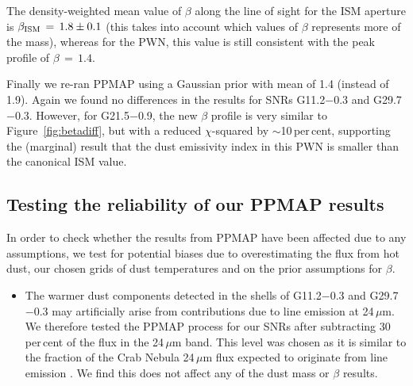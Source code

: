 \documentclass[fleqn,usenatbib]{mnras}
\begin{document}
{{The density-weighted mean value of $\beta$ along the line of sight for the ISM aperture is $\beta_{\rm ISM}\,=\,1.8 \pm 0.1$ (this takes into account which values of $\beta$ represents more of the mass), whereas for the PWN, this value is still consistent with the peak profile of $\beta\,=\,1.4$.

Finally we re-ran PPMAP using a Gaussian prior with mean of 1.4 (instead of 1.9). Again we found no differences in the results for SNRs G11.2$-$0.3 and G29.7$-$0.3. However, for G21.5$-$0.9, the new $\beta$ profile is very similar to Figure~\ref{fig:betadiff}, but with a reduced $\chi$-squared by $\sim$10\,per\,cent, supporting the (marginal) result that the dust emissivity index in this PWN is smaller than the canonical ISM value.

\subsection{Testing the reliability of our PPMAP results}
\label{sec:reliability}

In order to check whether the results from PPMAP have been affected due to any assumptions, we test for potential biases due to overestimating the flux from hot dust, our chosen grids of dust temperatures and on the prior assumptions for $\beta$.

\begin{itemize}

\item  The warmer dust components detected in the shells of G11.2$-$0.3 and G29.7$-$0.3 may artificially arise from contributions due to line emission at 24\,$\mu$m. We therefore tested the PPMAP process for our SNRs after subtracting 30\,per\,cent of the flux in the 24\,$\mu$m band. This level was chosen as it is similar to the fraction of the Crab Nebula 24\,$\mu$m flux expected to originate from line emission \citep{Temim2012}. We find this does not affect any of the dust mass or $\beta$ results.


\end{itemize}}}
\end{document}

